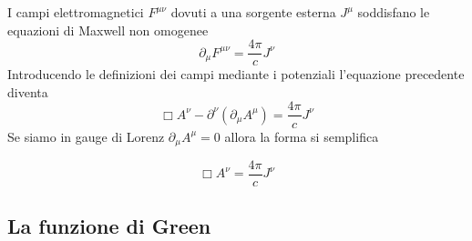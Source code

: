 I campi elettromagnetici $F^{\mu \nu}$ dovuti a una sorgente esterna $J^{\mu}$ soddisfano le equazioni di Maxwell non omogenee
\begin{equation*}
    \partial_{\mu}F^{\mu \nu} = \frac{4\pi}{c} J^\nu
\end{equation*}
Introducendo le definizioni dei campi mediante i potenziali l'equazione precedente diventa
\begin{equation*}
    \Box A^{\nu} - \partial^{\nu}(\partial_\mu A^{\mu}) = \frac{4\pi}{c}J^{\nu} 
\end{equation*}
Se siamo in gauge di Lorenz $\partial_\mu A^{\mu} = 0$ allora la forma si semplifica 
\begin{tcolorbox}[colback=black!5!white, colframe=black!45!white, boxrule=0.8pt]
\begin{equation}
\label{eq:potenziali_qcorrente}
    \Box A^{\nu} = \frac{4\pi}{c} J^\nu
\end{equation}
\end{tcolorbox}

\subsection*{La funzione di Green}

